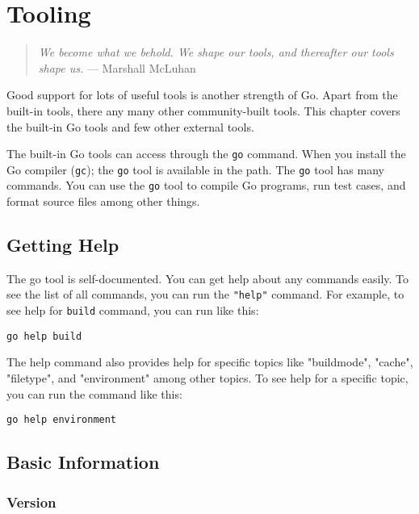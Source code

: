 \cleardoublepage
{}
\chapter{Tooling}

\begin{quote}
\textit{We become what we behold. We shape our tools, and thereafter our tools shape us.} --- Marshall McLuhan
\end{quote}

Good support for lots of useful tools is another strength of Go.
Apart from the built-in tools, there any many other community-built
tools.  This chapter covers the built-in Go tools and few other
external tools.

The built-in Go tools can access through the \texttt{go} command.
When you install the Go compiler (\texttt{gc}); the \texttt{go} tool
is available in the path.  The \texttt{go} tool has many commands.
You can use the \texttt{go} tool to compile Go programs, run test
cases, and format source files among other things.

\section{Getting Help}

The go tool is self-documented.  You can get help
about any commands easily.  To see the list of all commands, you can
run the \texttt{"help"} command.  For example, to see help
for \texttt{build} command, you can run like this:

\begin{lstlisting}[numbers=none]
go help build
\end{lstlisting}

The help command also provides help for specific topics like
"buildmode", "cache", "filetype", and "environment" among other
topics.  To see help for a specific topic, you can run the command
like this:

\begin{lstlisting}[numbers=none]
go help environment
\end{lstlisting}

\section{Basic Information}

\subsection{Version}

